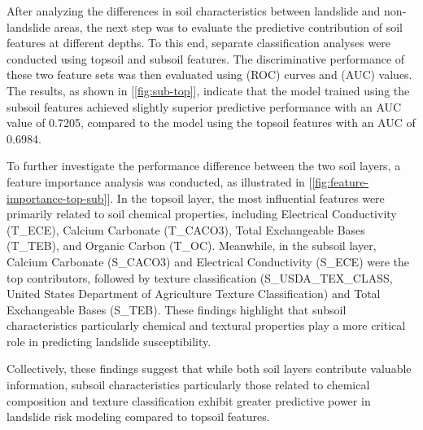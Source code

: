 After analyzing the differences in soil characteristics between landslide and non-landslide areas, the next step was to evaluate the predictive contribution of soil features at different depths. To this end, separate classification analyses were conducted using topsoil and subsoil features. The discriminative performance of these two feature sets was then evaluated using (ROC) curves and (AUC) values. The results, as shown in [\ref{fig:sub-top}], indicate that the model trained using the subsoil features achieved slightly superior predictive performance with an AUC value of 0.7205, compared to the model using the topsoil features with an AUC of 0.6984.

To further investigate the performance difference between the two soil layers, a feature importance analysis was conducted, as illustrated in [\ref{fig:feature-importance-top-sub}]. In the topsoil layer, the most influential features were primarily related to soil chemical properties, including Electrical Conductivity (T\_ECE), Calcium Carbonate (T\_CACO3), Total Exchangeable Bases (T\_TEB), and Organic Carbon (T\_OC). Meanwhile, in the subsoil layer, Calcium Carbonate (S\_CACO3) and Electrical Conductivity (S\_ECE) were the top contributors, followed by texture classification (S\_USDA\_TEX\_CLASS, United States Department of Agriculture Texture Classification) and Total Exchangeable Bases (S\_TEB). These findings highlight that subsoil characteristics particularly chemical and textural properties play a more critical role in predicting landslide susceptibility.

Collectively, these findings suggest that while both soil layers contribute valuable information, subsoil characteristics particularly those related to chemical composition and texture classification exhibit greater predictive power in landslide risk modeling compared to topsoil features.

